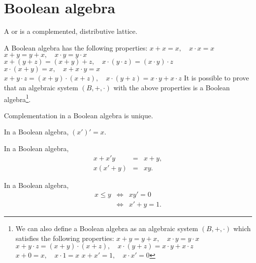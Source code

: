 \documentclass{myproc}
\begin{document}
\small


\section{Boolean algebra}
\begin{definition}
A  or  is a complemented,
distributive lattice. 
\end{definition}
A Boolean algebra has the following properties:
\bde
\w [(P1) Idempotent]  $x + x = x, \quad x\cdot{x} = x$
\w [(P2) Commutative] $x + y = y + x, \quad x\cdot{y} = y\cdot{x}$
\w [(P3) Associative] $x + (y + z) = (x + y) + z, \quad
			x\cdot(y\cdot{}z) = (x\cdot{}y)\cdot{}z$
\w [(P4) Absortive] $x\cdot(x+y) = x, \quad x + x\cdot{}y = x$
\w [(P5) Distributive] 
	$x + y\cdot{}z = (x+y)\cdot(x + z), \quad
	x\cdot(y + z) = x\cdot{}y + x\cdot{}z$
\ede
It is possible to prove that an algebraic system $(B, +, \cdot)$
with the above properties is a Boolean algebra\footnote{We can also
define a Boolean algebra as an algebraic system $(B, +, \cdot)$ which
satisfies the following properties:
\bde
\w [(P1$'$) Commutative] $x + y = y + x, \quad x\cdot{y} = y\cdot{x}$
\w [(P2$'$) Distributive] 
	$x + y\cdot{}z = (x+y)\cdot(x + z), \quad
	x\cdot(y + z) = x\cdot{}y + x\cdot{}z$
\w [(P3$'$) Identities]
	$x + 0 = x, \quad x\cdot{}1 = x$
	$x + x' = 1, \quad  x\cdot{}x' = 0$
\ede}.

\begin{theorem}
Complementation in a Boolean algebra is unique.
\end{theorem}

\begin{theorem}[Involution]
In a Boolean algebra, $(x')' = x$.
\end{theorem}

\begin{theorem}
In a Boolean algebra,
\begin{eqnarray*}
	x + x'y & = & x + y,\\
	x(x'+y) & = & xy.
\end{eqnarray*}
\end{theorem}

\begin{theorem}
In a Boolean algebra,
\begin{eqnarray*}
	x \le y & \Leftrightarrow & xy' = 0\\
		& \Leftrightarrow & x' + y = 1.
\end{eqnarray*}
\end{theorem}
\end{document}
